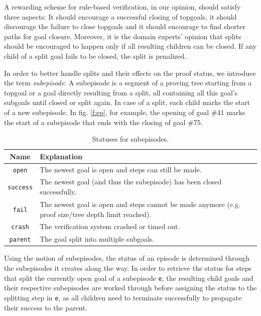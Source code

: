 \documentclass[runningheads,a4paper]{llncs}
\begin{document}
A rewarding scheme for rule-based verification, in our opinion, should satisfy three aspects: It should encourage a successful closing of topgoals, it should discourage the failure to close topgoals and it should encourage to find shorter paths for goal closure. Moreover, it is the domain experts' opinion that splits should be encouraged to happen only if all resulting children can be closed. If any child of a split goal fails to be closed, the split is penalized.

In order to better handle splits and their effects on the proof status, we introduce the term \textit{subepisode}: A subepisode is a segment of a proving tree starting from a topgoal or a goal directly resulting from a split, all containing all this goal's subgoals until closed or split again. In case of a split, each child marks the start of a new subepisode. In fig. \ref{f:ep}, for example, the opening of goal \#41 marks the start of a subepisode that ends with the closing of goal \#75.

\begin{table}[ht]
	\begin{tabularx}{\textwidth}{ |c|X| } \hline
		Name & Explanation \\ \hline \hline
		
		\texttt{open} & The newest goal is open and steps can still be made. \\ \hline
		\texttt{success} & The newest goal (and thus the subepisode) has been closed successfully. \\ \hline
		\texttt{fail} & The newest goal is open and steps cannot be made anymore (e.g. proof size/tree depth limit reached).\\ \hline
		\texttt{crash} & The verification system crashed or timed out. \\ \hline
		\texttt{parent} & The goal split into multiple subgoals. \\ \hline
		
	\end{tabularx}
\vspace*{2pt}
\caption{Statuses for subepisodes.}
\label{t:statuses}
\end{table}

Using the notion of subepisodes, the status of an episode is determined through the subepisodes it creates along the way. In order to retrieve the status for steps that split the currently open goal of a subepisode \texttt{e}, the resulting child goals and their respective subepisodes are worked through before assigning the status to the splitting step in \texttt{e}, as all children need to terminate successfully to propagate their success to the parent.
\end{document}
